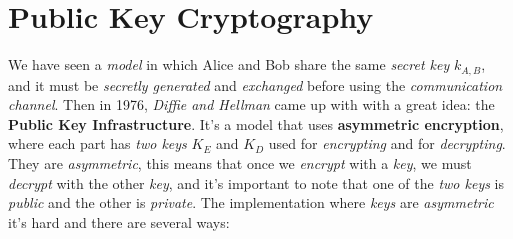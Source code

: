 \documentclass{article}
\begin{document}
\section{Public Key Cryptography}
We have seen a \emph{model} in which Alice and Bob share the same \emph{secret key} $k_{A,B}$, and it must be \emph{secretly generated} and \emph{exchanged} before using the \emph{communication channel}. Then in 1976, \emph{Diffie and Hellman} came up with with a great idea: the \textbf{Public Key Infrastructure}. It's a model that uses \textbf{asymmetric encryption}, where each part has \emph{two keys} $K_E$ and $K_D$ used for \emph{encrypting} and for \emph{decrypting}. They are \emph{asymmetric}, this means that once we \emph{encrypt} with a \emph{key}, we must \emph{decrypt} with the other \emph{key}, and it's important to note that one of the\emph{ two keys} is \emph{public} and the other is \emph{private}. The implementation where \emph{keys} are \emph{asymmetric} it's hard and there are several ways:
\end{document}
